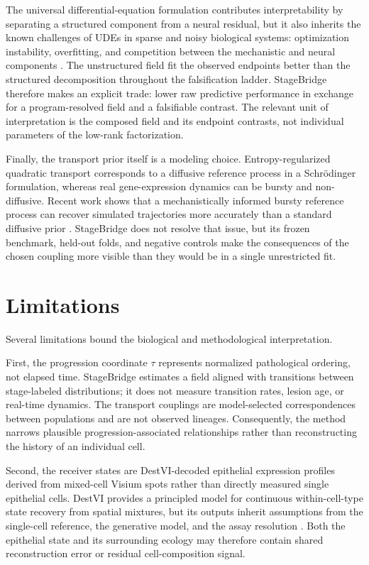 The universal differential-equation formulation contributes interpretability by separating a structured component from a neural residual, but it also inherits the known challenges of UDEs in sparse and noisy biological systems: optimization instability, overfitting, and competition between the mechanistic and neural components \autocite{Philipps2025-jl}. The unstructured field fit the observed endpoints better than the structured decomposition throughout the falsification ladder. StageBridge therefore makes an explicit trade: lower raw predictive performance in exchange for a program-resolved field and a falsifiable contrast. The relevant unit of interpretation is the composed field and its endpoint contrasts, not individual parameters of the low-rank factorization.

Finally, the transport prior itself is a modeling choice. Entropy-regularized quadratic transport corresponds to a diffusive reference process in a Schrödinger formulation, whereas real gene-expression dynamics can be bursty and non-diffusive. Recent work shows that a mechanistically informed bursty reference process can recover simulated trajectories more accurately than a standard diffusive prior \autocite{Fournie2026-kj}. StageBridge does not resolve that issue, but its frozen benchmark, held-out folds, and negative controls make the consequences of the chosen coupling more visible than they would be in a single unrestricted fit.

\section{Limitations}
\label{sec:discussion-limitations}

Several limitations bound the biological and methodological interpretation.

First, the progression coordinate $\tau$ represents normalized pathological ordering, not elapsed time. StageBridge estimates a field aligned with transitions between stage-labeled distributions; it does not measure transition rates, lesion age, or real-time dynamics. The transport couplings are model-selected correspondences between populations and are not observed lineages. Consequently, the method narrows plausible progression-associated relationships rather than reconstructing the history of an individual cell.

Second, the receiver states are DestVI-decoded epithelial expression profiles derived from mixed-cell Visium spots rather than directly measured single epithelial cells. DestVI provides a principled model for continuous within-cell-type state recovery from spatial mixtures, but its outputs inherit assumptions from the single-cell reference, the generative model, and the assay resolution \autocite{Lopez2022-ps}. Both the epithelial state and its surrounding ecology may therefore contain shared reconstruction error or residual cell-composition signal.

